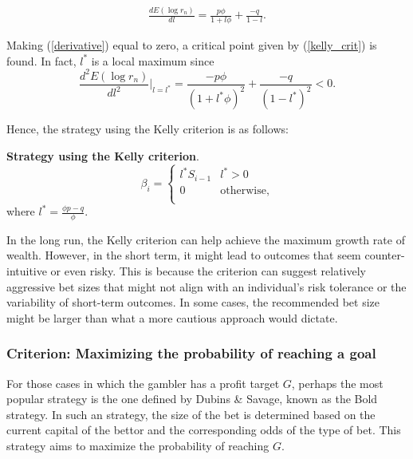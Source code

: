 \documentclass[11pt,twoside]{article}
\numberwithin{Theorem}{section}
\numberwithin{Definition}{section}
\numberwithin{Lemma}{section}
\numberwithin{Algorithm}{section}
\numberwithin{equation}{section}
\begin{document}
\begin{eqnarray}\label{derivative}
\frac{dE(\log r_{n})}{dl}= \frac{p\phi}{1 + l\phi} + \frac{-q}{1 - l}.
\end{eqnarray}

Making (\ref{derivative}) equal to zero, a critical point given by (\ref{kelly_crit}) is found. In fact, $l^{*}$ is a local maximum since
$$\frac{d^{2}E(\log r_{n})}{d l^{2}}\bigg|_{l=l^{*}} =\frac{-p\phi}{(1 + l^{*}\phi)^{2}} + \frac{-q}{(1 - l^{*})^{2}} < 0.$$

Hence, the strategy using the Kelly criterion is as follows: 
\begin{tcolorbox}[colback=gray!10,boxrule=0.25pt]
\textbf{Strategy using the Kelly criterion}. \\
\begin{equation*}
\beta_{i} = \left\{
\begin{array}{ll}
l^{*}S_{i-1}&  l^{*}>0\\
0 &  \text{otherwise},\\
\end{array}
\right.
\end{equation*}\label{strategy_kelly}
\centering
where  $l^{*} = \frac{\phi p-q}{\phi}$.
\end{tcolorbox}

In the long run, the Kelly criterion can help achieve the maximum growth rate of wealth. However, in the short term, it might lead to outcomes that seem counter-intuitive or even risky. This is because the criterion can suggest relatively aggressive bet sizes that might not align with an individual's risk tolerance or the variability of short-term outcomes. In some cases, the recommended bet size might be larger than what a more cautious approach would dictate.

\subsubsection{Criterion: Maximizing the probability of reaching a goal}
For those cases in which the gambler has a profit target $G$, perhaps the most popular strategy is the one defined by Dubins \& Savage\cite{Dubins}, known as the Bold strategy. In such an strategy, the size of the bet is determined based on the current capital of the bettor and the corresponding odds of the type of bet. This strategy aims to maximize the probability of reaching $G$.
\end{document}

